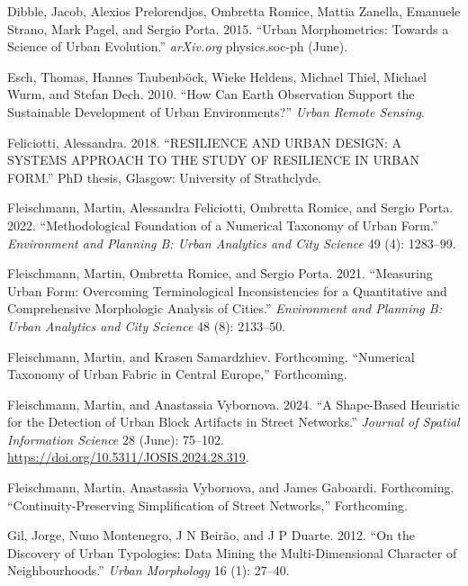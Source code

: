\documentclass[
  letterpaper,
  DIV=11,
  numbers=noendperiod]{scrartcl}
\newlength{\cslhangindent}
\newenvironment{CSLReferences}[2] %
 {\begin{list}{}{%
  \setlength{\itemindent}{0pt}
  \setlength{\leftmargin}{0pt}
  \setlength{\parsep}{0pt}
  \ifodd #1
   \setlength{\leftmargin}{\cslhangindent}
   \setlength{\itemindent}{-1\cslhangindent}
  \fi
  \setlength{\itemsep}{#2\baselineskip}}}
 {\end{list}}
\begin{document}
\begin{CSLReferences}{1}{0}
Dibble, Jacob, Alexios Prelorendjos, Ombretta Romice, Mattia Zanella,
Emanuele Strano, Mark Pagel, and Sergio Porta. 2015. {``Urban
{Morphometrics}: {Towards} a {Science} of {Urban Evolution}.''}
\emph{arXiv.org} physics.soc-ph (June).

Esch, Thomas, Hannes Taubenböck, Wieke Heldens, Michael Thiel, Michael
Wurm, and Stefan Dech. 2010. {``How Can Earth Observation Support the
Sustainable Development of Urban Environments?''} \emph{Urban Remote
Sensing}.

Feliciotti, Alessandra. 2018. {``{RESILIENCE AND URBAN DESIGN}: {A
SYSTEMS APPROACH TO THE STUDY OF RESILIENCE IN URBAN FORM}.''} PhD
thesis, {Glasgow}: University of Strathclyde.

Fleischmann, Martin, Alessandra Feliciotti, Ombretta Romice, and Sergio
Porta. 2022. {``Methodological Foundation of a Numerical Taxonomy of
Urban Form.''} \emph{Environment and Planning B: Urban Analytics and
City Science} 49 (4): 1283--99.

Fleischmann, Martin, Ombretta Romice, and Sergio Porta. 2021.
{``Measuring Urban Form: Overcoming Terminological Inconsistencies for a
Quantitative and Comprehensive Morphologic Analysis of Cities.''}
\emph{Environment and Planning B: Urban Analytics and City Science} 48
(8): 2133--50.

Fleischmann, Martin, and Krasen Samardzhiev. Forthcoming. {``Numerical
Taxonomy of Urban Fabric in Central Europe,''} Forthcoming.

Fleischmann, Martin, and Anastassia Vybornova. 2024. {``A Shape-Based
Heuristic for the Detection of Urban Block Artifacts in Street
Networks.''} \emph{Journal of Spatial Information Science} 28 (June):
75--102. \url{https://doi.org/10.5311/JOSIS.2024.28.319}.

Fleischmann, Martin, Anastassia Vybornova, and James Gaboardi.
Forthcoming. {``Continuity-Preserving Simplification of Street
Networks,''} Forthcoming.

Gil, Jorge, Nuno Montenegro, J N Beirão, and J P Duarte. 2012. {``On the
{Discovery} of {Urban Typologies}: {Data Mining} the {Multi}-Dimensional
{Character} of {Neighbourhoods}.''} \emph{Urban Morphology} 16 (1):
27--40.


\end{CSLReferences}
\end{document}
